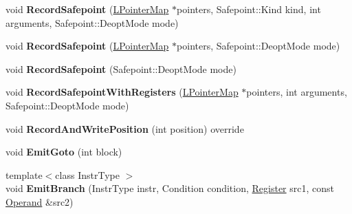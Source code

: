 \begin{DoxyCompactItemize}
\item 
void {\bfseries Record\+Safepoint} (\hyperlink{classv8_1_1internal_1_1_l_pointer_map}{L\+Pointer\+Map} $\ast$pointers, Safepoint\+::\+Kind kind, int arguments, Safepoint\+::\+Deopt\+Mode mode)\hypertarget{classv8_1_1internal_1_1_l_code_gen_a5c5e6c0360111f74e6c274c456c70b74}{}\label{classv8_1_1internal_1_1_l_code_gen_a5c5e6c0360111f74e6c274c456c70b74}

\item 
void {\bfseries Record\+Safepoint} (\hyperlink{classv8_1_1internal_1_1_l_pointer_map}{L\+Pointer\+Map} $\ast$pointers, Safepoint\+::\+Deopt\+Mode mode)\hypertarget{classv8_1_1internal_1_1_l_code_gen_a7f742e0bc068c384673a3490e15b230c}{}\label{classv8_1_1internal_1_1_l_code_gen_a7f742e0bc068c384673a3490e15b230c}

\item 
void {\bfseries Record\+Safepoint} (Safepoint\+::\+Deopt\+Mode mode)\hypertarget{classv8_1_1internal_1_1_l_code_gen_a3621dccea782082b57057f617a9dd24a}{}\label{classv8_1_1internal_1_1_l_code_gen_a3621dccea782082b57057f617a9dd24a}

\item 
void {\bfseries Record\+Safepoint\+With\+Registers} (\hyperlink{classv8_1_1internal_1_1_l_pointer_map}{L\+Pointer\+Map} $\ast$pointers, int arguments, Safepoint\+::\+Deopt\+Mode mode)\hypertarget{classv8_1_1internal_1_1_l_code_gen_a15c074803ff1d0270234efb3e8830c75}{}\label{classv8_1_1internal_1_1_l_code_gen_a15c074803ff1d0270234efb3e8830c75}

\item 
void {\bfseries Record\+And\+Write\+Position} (int position) override\hypertarget{classv8_1_1internal_1_1_l_code_gen_a7f2c2fb5fe21ed4f96fa43839a3c459d}{}\label{classv8_1_1internal_1_1_l_code_gen_a7f2c2fb5fe21ed4f96fa43839a3c459d}

\item 
void {\bfseries Emit\+Goto} (int block)\hypertarget{classv8_1_1internal_1_1_l_code_gen_a77ef06fc94dce505c88f628d129c114d}{}\label{classv8_1_1internal_1_1_l_code_gen_a77ef06fc94dce505c88f628d129c114d}

\item 
{\footnotesize template$<$class Instr\+Type $>$ }\\void {\bfseries Emit\+Branch} (Instr\+Type instr, Condition condition, \hyperlink{structv8_1_1internal_1_1_register}{Register} src1, const \hyperlink{classv8_1_1internal_1_1_operand}{Operand} \&src2)\hypertarget{classv8_1_1internal_1_1_l_code_gen_a4ae533afdcc614be4a85d3b541286053}{}\label{classv8_1_1internal_1_1_l_code_gen_a4ae533afdcc614be4a85d3b541286053}


\end{DoxyCompactItemize}
